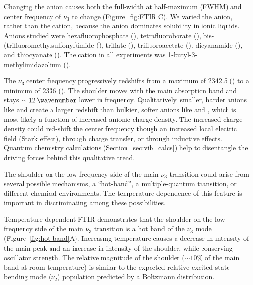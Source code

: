 \documentclass[%
  class = book,%
  crop = false,%
  float = true,%
  multi = true,%
  preview = false,%
]{standalone}
\begin{document}
{Changing the anion causes both the full-width at half-maximum (FWHM) and center frequency of \(\nu_3\) to change (Figure~\ref{fig:FTIR}C). We varied the anion, rather than the cation, because the anion dominates  solubility in ionic liquids.\cite{anthonyJPCB-05,Cadena2004,Bhargava2007} Anions studied were hexafluorophosphate (), tetrafluoroborate (), bis-(trifluoromethylsulfonyl)imide (), triflate (), trifluoroacetate (), dicyanamide (), and thiocyanate (). The cation in all experiments was 1-butyl-3-methylimidazolium (\ce{[Im_{4,1}]}).

The \(\nu_3\) center frequency progressively redshifts from a maximum of \SI{2342.5}{\wavenumber} (\ce{[PF6]-}) to a minimum of \SI{2336}{\wavenumber} (\ce{[SCN]-}). The shoulder moves with the main absorption band and stays \(\sim\SI{12}{\wavenumber}\) lower in frequency.  Qualitatively, smaller, harder anions like \ce{[SCN]-} and \ce{[DCA]-} create a larger redshift than bulkier, softer anions like \ce{[Tf2N]-} and \ce{[TfO]-}, which is most likely a function of increased anionic charge density. The increased charge density could red-shift the  center frequency though an increased local electric field (Stark effect), through charge transfer, or through inductive effects. Quantum chemistry calculations (Section~\ref{sec:vib_calcs}) help to disentangle the driving forces behind this qualitative trend.

The shoulder on the low frequency side of the main \(\nu_3\) transition could arise from several possible mechanisms, a ``hot-band'', a multiple-quantum transition, or different chemical environments. The temperature dependence of this feature is important in discriminating among these possibilities.

Temperature-dependent FTIR demonstrates that the shoulder on the low frequency side of the main \(\nu_3\) transition  is a hot band of the \(\nu_3\) mode (Figure~\ref{fig:hot band}A). Increasing temperature causes a decrease in intensity of the main peak and an increase in intensity of the shoulder, while conserving oscillator strength. The relative magnitude of the shoulder (\(\sim 10\%\) of the main band at room temperature) is similar to the expected relative excited state bending mode (\(\nu_2\)) population predicted by a Boltzmann distribution.

}
\end{document}
